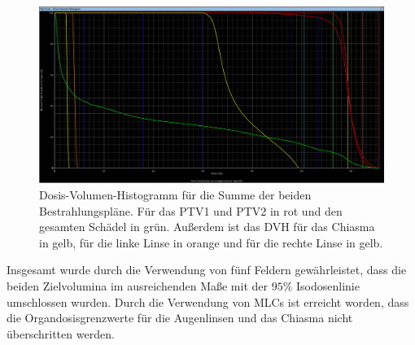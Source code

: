 \begin{figure}[H]
  \centering
  \includegraphics[width=\textwidth]{Bilder/Teilhirn_vergleich2.png}
  \caption{Dosis-Volumen-Histogramm für die Summe der beiden Bestrahlungspläne. Für das PTV1 und PTV2 in rot und den gesamten Schädel in grün. Außerdem ist das DVH für das Chiasma in gelb, für die linke Linse in orange und für die rechte Linse in gelb.}
  \label{abb:DVHsum}
\end{figure}


Insgesamt wurde durch die Verwendung von fünf Feldern gewährleistet, dass die
beiden Zielvolumina im ausreichenden Maße mit der $95\%$ Isodosenlinie umschlossen wurden.
Durch die Verwendung von MLCs ist erreicht worden, dass die Organdosisgrenzwerte für
die Augenlinsen und das Chiasma nicht überschritten werden.
